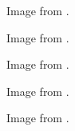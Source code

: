 	\begin{minipage}{\textwidth}
		Image from \cite{rice}.
	\end{minipage}

	\begin{minipage}{\textwidth}
		Image from \cite{potato}.
	\end{minipage}

	\begin{minipage}{\textwidth}
		Image from \cite{soup}.
	\end{minipage}

	\begin{minipage}{\textwidth}
		Image from \cite{pasta}.
	\end{minipage}

	\begin{minipage}{\textwidth}
		Image from \cite{grass}.
	\end{minipage}
